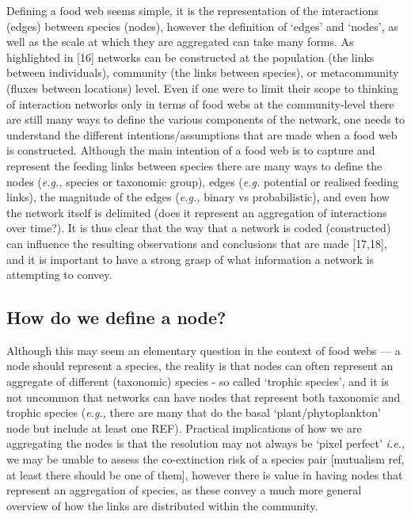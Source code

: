 \documentclass[
]{article}
\begin{document}
Defining a food web seems simple, it is the representation of the
interactions (edges) between species (nodes), however the definition of
`edges' and `nodes', as well as the scale at which they are aggregated
can take many forms. As highlighted in {[}16{]} networks can be
constructed at the population (the links between individuals), community
(the links between species), or metacommunity (fluxes between locations)
level. Even if one were to limit their scope to thinking of interaction
networks only in terms of food webs at the community-level there are
still many ways to define the various components of the network, one
needs to understand the different intentions/assumptions that are made
when a food web is constructed. Although the main intention of a food
web is to capture and represent the feeding links between species there
are many ways to define the nodes (\emph{e.g.,} species or taxonomic
group), edges (\emph{e.g.} potential or realised feeding links), the
magnitude of the edges (\emph{e.g.,} binary vs probabilistic), and even
how the network itself is delimited (does it represent an aggregation of
interactions over time?). It is thus clear that the way that a network
is coded (constructed) can influence the resulting observations and
conclusions that are made {[}17,18{]}, and it is important to have a
strong grasp of what information a network is attempting to convey.

\subsection{How do we define a node?}\label{how-do-we-define-a-node}

Although this may seem an elementary question in the context of food
webs --- a node should represent a species, the reality is that nodes
can often represent an aggregate of different (taxonomic) species - so
called `trophic species', and it is not uncommon that networks can have
nodes that represent both taxonomic and trophic species (\emph{e.g.,}
there are many that do the basal `plant/phytoplankton' node but include
at least one REF). Practical implications of how we are aggregating the
nodes is that the resolution may not always be `pixel perfect'
\emph{i.e.,} we may be unable to assess the co-extinction risk of a
species pair {[}mutualism ref, at least there should be one of them{]},
however there is value in having nodes that represent an aggregation of
species, as these convey a much more general overview of how the links
are distributed within the community.
\end{document}
